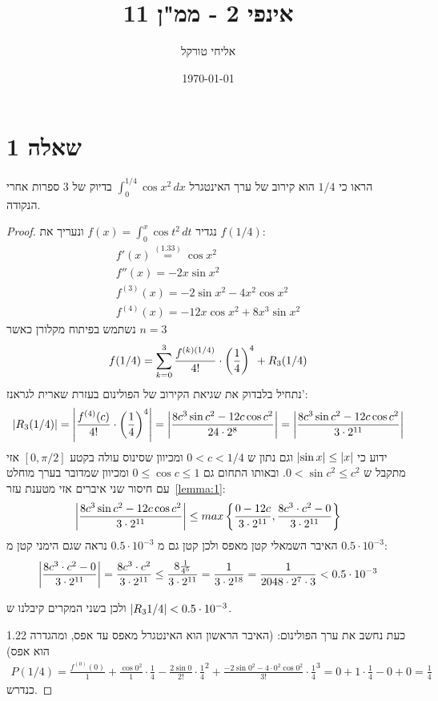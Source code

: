 \documentclass{article}
\title{אינפי 2 - ממ"ן 11}
\author{אליחי טורקל \ID}
\date\today
\begin{document}
	\maketitle %


	\section*{שאלה 1}
	הראו כי $1/4$ הוא קירוב של ערך האינטגרל $\int_0^{1/4} \cos x^2 \, dx$ בדיוק של 3 ספרות אחרי הנקודה.

	\begin{proof}
		נגדיר $f(x) = \int_0^x \cos t^2 \, dt$ ונעריך את $f(1/4)$:
		\begin{align*}
			f'(x) \overset{(1.33)}= \cos x^2 \\
			f''(x) = -2x \sin x^2 \\
			f^{(3)}(x) = -2\sin x^2 -4x^2 \cos x^2 \\
			f^{(4)}(x) = -12 x \cos x^2 + 8x^3 \sin x^2
		\end{align*}
		נשתמש בפיתוח מקלורן כאשר $n=3$
		\begin{align*}
			f(1/4) = \sum^3_{k=0} \frac{f^{(k)(1/4)}}{4!} \cdot \left( \frac{1}{4} \right)^4 + R_3(1/4)
		\end{align*}
		נתחיל בלבדוק את שגיאת הקירוב של הפולינום בעזרת שארית לגראנז':
		\begin{align*}
			\left| R_3(1/4) \right| = \left| \frac{f^{(4)}(c)}{4!} \cdot \left( \frac{1}{4} \right)^4 \right|
			= \left| \frac{8c^3 \sin c^2 - 12c \cos c^2}{24 \cdot 2^8} \right|
			= \left| \frac{8c^3 \sin c^2 - 12c \cos c^2}{3 \cdot 2^{11}} \right|
		\end{align*}
		ידוע כי $\left| \sin x \right| \leq \left| x \right|$ וגם נתון ש $0 < c < 1/4$ ומכיוון שסינוס עולה בקטע $[0, \pi/2]$
		אזי מתקבל ש $0 < \sin c^2 \leq c^2$.
		ובאותו התחום גם $0 \leq \cos c \leq 1$ ומכיוון שמדובר בערך מוחלט עם חיסור שני איברים אזי מטענת עזר~\ref{lemma:1}:
		\begin{align*}
			\left| \frac{8c^3 \sin c^2 - 12 c \cos c^2}{3 \cdot 2^{11}} \right| \leq
			max \left\{
				 \frac{0 - 12c}{3 \cdot 2^{11}},
				 \frac{8c^3 \cdot c^2 - 0}{3 \cdot 2^{11}}
				 \right\}
		\end{align*}
		האיבר השמאלי קטן מאפס ולכן קטן גם מ $0.5 \cdot 10^{-3}$ נראה שגם הימני קטן מ $0.5 \cdot 10^{-3}$:
		\begin{align*}
			\left| \frac{8c^3 \cdot c^2 - 0}{3 \cdot 2^{11}} \right|
			= \frac{8c^3 \cdot c^2}{3 \cdot 2^{11}}
			\leq \frac{8 \frac{1}{4^5}}{3 \cdot 2^{11}}
			= \frac{1}{3 \cdot 2^{18}}
			= \frac{1}{2048 \cdot 2^7 \cdot 3}
			< 0.5 \cdot 10^{-3}
		\end{align*}

		ולכן בשני המקרים קיבלנו ש $\left| R_3{1/4} \right| < 0.5 \cdot 10^{-3}$.

		כעת נחשב את ערך הפולינום: (האיבר הראשון הוא האינטגרל מאפס עד אפס, ומהגדרה 1.22 הוא אפס)
		\begin{align*}
			P(1/4)
			= \frac{f^{(0)}(0)}{1} + \frac{\cos 0^2}{1}\cdot\frac{1}{4} - \frac{2\sin 0}{2!} \cdot\frac{1}{4}^2 + \frac{-2 \sin 0^2 -4 \cdot 0^2 \cos 0^2}{3!} \cdot\frac{1}{4}^3
			= 0 + 1 \cdot \frac{1}{4} - 0 + 0 = \frac{1}{4}
		\end{align*}
		כנדרש.
	\end{proof}
\end{document}
